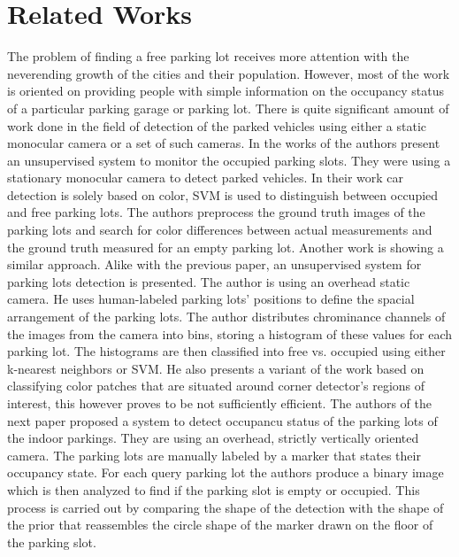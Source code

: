 \chapter{Related Works}
\label{cha:related_works}

The problem of finding a free parking lot receives more attention with the
neverending growth of the cities and their population.
However, most of the work is oriented on providing people with simple
information on the occupancy status of a particular parking garage or parking
lot.
There is quite significant amount of work done in the field of detection of the
parked vehicles using either a static monocular camera or a set of such cameras.
In the works of \cite{qizhang06} the authors present an unsupervised system to
monitor the occupied parking slots. They were using a stationary monocular
camera to detect parked vehicles.
In their work car detection is solely based on color, SVM is used to distinguish
between occupied and free parking lots. The authors preprocess the ground truth
images of the parking lots and search for color differences between actual
measurements and the ground truth measured for an empty parking lot.
\newline 
Another work \cite{nicolastrue} is showing a similar approach. Alike with the
previous paper, an unsupervised system for parking lots detection is presented.
The author is using an overhead static camera. He uses human-labeled parking
lots' positions to define the spacial arrangement of the parking lots. The
author distributes chrominance channels of the images from the camera into bins,
storing a histogram of these values for each parking lot. The histograms are
then classified into free vs. occupied using either k-nearest neighbors or SVM.
He also presents a variant of the work based on classifying color patches that
are situated around corner detector's regions of interest, this however proves
to be not sufficiently efficient. 
\newline
The authors of the next paper \cite{yusnita12} proposed a system to detect
occupancu status of the parking lots of the indoor parkings. They are using an
overhead, strictly vertically oriented camera. The parking lots are manually
labeled by a marker that states their occupancy state. For each query parking
lot the authors produce a binary image which is then analyzed to find if the
parking slot is empty or occupied. This process is carried out by comparing the
shape of the detection with the shape of the prior that reassembles the circle
shape of the marker drawn on the floor of the parking slot.
